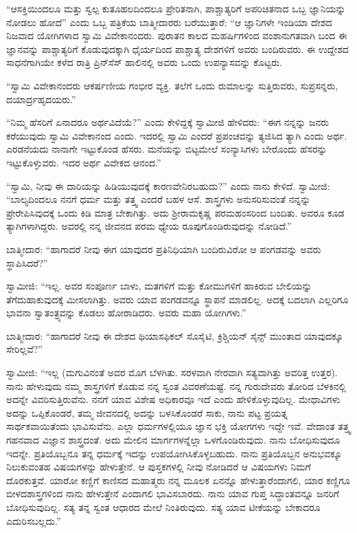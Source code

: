  “ಆಸಕ್ತಿಯಿಂದಲೂ ಮತ್ತು ಸ್ವಲ್ಪ ಕುತೂಹಲದಿಂದಲೂ ಪ್ರೇರಿತನಾಗಿ, ಪಾಶ್ಚಾತ್ಯರಿಗೆ ಅಪರಿಚಿತನಾದ ಒಬ್ಬ ಜ್ಞಾನಿಯನ್ನು ನೋಡಲು ಹೋದೆ” ಎಂದು ಒಬ್ಬ ಪತ್ರಿಕೆಯ ಬಾತ್ಮೀದಾರರು ಬರೆಯುತ್ತಾರೆ: “ಆ ಜ್ಞಾನಿಗಳೇ ಇಂಡಿಯಾ ದೇಶದ ನಿಜವಾದ ಯೋಗಿಗಳಾದ ಸ್ವಾಮಿ ವಿವೇಕಾನಂದರು. ಪುರಾತನ ಕಾಲದ ಮಹರ್ಷಿಗಳಿಂದ ವಂಶಾನುಗತವಾಗಿ ಬಂದ ಈ ಜ್ಞಾನವನ್ನು ಪಾಶ್ಚಾತ್ಯರಿಗೆ ಕೊಡುವುದಕ್ಕಾಗಿ ಧೈರ್ಯದಿಂದ ಪಾಶ್ಚಾತ್ಯ ದೇಶಗಳಿಗೆ ಅವರು ಬಂದಿರುವರು. ಈ ಉದ್ದೇಶದ ಸಾಧನೆಗಾಗಿಯೇ ಕಳೆದ ರಾತ್ರಿ ಪ್ರಿನ್‍ಸೆಸ್ ಹಾಲಿನಲ್ಲಿ ಅವರು ಒಂದು ಉಪನ್ಯಾಸವನ್ನು ಕೊಟ್ಟರು. 

 “ಸ್ವಾಮಿ ವಿವೇಕಾನಂದರು ಆಕರ್ಷಣೀಯ ಗಂಭೀರ ವ್ಯಕ್ತಿ. ತಲೆಗೆ ಒಂದು ರುಮಾಲನ್ನು ಸುತ್ತಿರುವರು, ಸುಪ್ರಸನ್ನರು, ದಯಾರ್ದ್ರಹೃದಯರು.” 

 “ನಿಮ್ಮ ಹೆಸರಿಗೆ ಏನಾದರೂ ಅರ್ಥವಿದೆಯೆ?” ಎಂದು ಕೇಳಿದ್ದಕ್ಕೆ ಸ್ವಾಮೀಜಿ ಹೇಳಿದರು: “ಈಗ ನನ್ನನ್ನು ಜನರು ಕರೆಯುವುದು ಸ್ವಾಮಿ ವಿವೇಕಾನಂದ ಎಂದು. ಇದರಲ್ಲಿ ಸ್ವಾಮಿ ಎಂದರೆ ಪ್ರಪಂಚವನ್ನು ತ್ಯಜಿಸಿದ ತ್ಯಾಗಿ ಎಂದು ಅರ್ಥ. ಎರಡನೆಯದು ನಾನಾಗೇ ಇಟ್ಟುಕೊಂಡ ಹೆಸರು. ಮನೆಯನ್ನು ಬಿಟ್ಟಮೇಲೆ ಸಂನ್ಯಾಸಿಗಳು ಬೇರೊಂದು ಹೆಸರನ್ನು ಇಟ್ಟುಕೊಳ್ಳುವರು. ಇದರ ಅರ್ಥ ವಿವೇಕದ ಆನಂದ.” 

 “ಸ್ವಾಮಿ, ನೀವು ಈ ದಾರಿಯನ್ನು ಹಿಡಿಯುವುದಕ್ಕೆ ಕಾರಣವೇನಿರಬಹುದು?” ಎಂದು ನಾನು ಕೇಳಿದೆ. ಸ್ವಾಮೀಜಿ: “ಬಾಲ್ಯದಿಂದಲೂ ನನಗೆ ಧರ್ಮ ಮತ್ತು ತತ್ತ್ವ ಎಂದರೆ ಬಹಳ ಆಸೆ. ಶಾಸ್ತ್ರಗಳು ಅನುಸರಿಸುವಂತೆ ನನ್ನನ್ನು ಪ್ರೇರೇಪಿಸಿವುದಕ್ಕೆ ಒಂದು ಕಿಡಿ ಮಾತ್ರ ಬೇಕಾಗಿತ್ತು. ಅದು ಶ‍್ರೀರಾಮಕೃಷ್ಣ ಪರಮಹಂಸರಿಂದ ಬಂದಿತು. ಅವರೂ ಕೂಡ ತ್ಯಾಗಿಗಳಾಗಿದ್ದರು. ಅವರಲ್ಲಿ ನನ್ನ ಜೀವನದ ಪರಮ ಧ್ಯೇಯ ರೂಪುಗೊಂಡಿರುವುದನ್ನು ನೋಡಿದೆ.” 

\vskip 3pt

 ಬಾತ್ಮೀದಾರ: “ಹಾಗಾದರೆ ನೀವು ಈಗ ಯಾವುದರ ಪ್ರತಿನಿಧಿಯಾಗಿ ಬಂದಿರುವಿರೋ ಆ ಪಂಗಡವನ್ನು ಅವರು ಸ್ಥಾಪಿಸಿದರೆ?” 

\vskip 3pt

 ಸ್ವಾಮೀಜಿ: “ಇಲ್ಲ. ಅವರ ಸಂಪೂರ್ಣ ಬಾಳು, ಮತಗಳಿಗೆ ಮತ್ತು ಕೋಮುಗಳಿಗೆ ಹಾಕಿರುವ ಬೇಲಿಯನ್ನು ತೆಗೆದುಹಾಕುವುದಕ್ಕೆ ಮೀಸಲಾಗಿತ್ತು. ಅವರು ಯಾವ ಪಂಗಡವನ್ನೂ ಸ್ಥಾಪನೆ ಮಾಡಲಿಲ್ಲ. ಅದಕ್ಕೆ ಬದಲಾಗಿ ಎಲ್ಲರಿಗೂ ಭಾವನಾ ಸ್ವಾತಂತ್ರ್ಯವನ್ನು ಕೊಡಲು ಹೋರಾಡಿದರು. ಅವರು ಮಹಾ ಯೋಗಿಗಳು.” 

\vskip 3pt

 ಬಾತ್ಮೀದಾರ: “ಹಾಗಾದರೆ ನೀವು ಈ ದೇಶದ ಥಿಯಾಸಫಿಕಲ್ ಸೊಸೈಟಿ, ಕ್ರಿಶ್ಚಿಯನ್ ಸೈನ್ಸ್ ಮುಂತಾದ ಯಾವುದಕ್ಕೂ ಸೇರಿಲ್ಲವೆ?” 

 ಸ್ವಾಮೀಜಿ: “ಇಲ್ಲ (ಮಗುವಿನಂತೆ ಅವರ ಮೊಗ ಬೆಳಗಿತು. ಸರಳವಾಗಿ ನೇರವಾಗಿ ಸತ್ಯವಾಗಿತ್ತು ಅವರಿತ್ತ ಉತ್ತರ). ನಾನು ಹೇಳುವುದು ನಮ್ಮ ಶಾಸ್ತ್ರಗಳಿಗೆ ಕೊಡುವ ನನ್ನ ಸ್ವಂತ ವಿವರಣೆಯಷ್ಟೆ. ನನ್ನ ಗುರುದೇವರು ತೋರಿದ ಬೆಳಕಿನಲ್ಲಿ ಅದನ್ನೇ ವಿವರಿಸುತ್ತಿರುವೆನು. ನನಗೆ ಯಾವ ವಿಶೇಷ ಅಧಿಕಾರವೂ ಇದೆ ಎಂದು ಹೇಳಿಕೊಳ್ಳುವುದಿಲ್ಲ. ಮೇಧಾವಿಗಳು ಅದನ್ನು ಒಪ್ಪಿಕೊಂಡರೆ, ತಮ್ಮ ಜೀವನದಲ್ಲಿ ಅದನ್ನು ಬಳಸಿಕೊಂಡರೆ ಸಾಕು, ನಾನು ಪಟ್ಟ ಪ್ರಯತ್ನ ಸಾರ್ಥಕವಾಯಿತೆಂದು ಭಾವಿಸುವೆನು. ಎಲ್ಲಾ ಧರ್ಮಗಳಲ್ಲಿಯೂ ಜ್ಞಾನ ಭಕ್ತಿ ಯೋಗಗಳು ಇದ್ದೇ ಇವೆ. ವೇದಾಂತ ತತ್ತ್ವ ಗಹನವಾದ ವಿಜ್ಞಾನ ಶಾಸ್ತ್ರದಂತೆ. ಅದು ಮೇಲಿನ ಮಾರ್ಗಗಳನ್ನೆಲ್ಲಾ ಒಳಗೊಂಡಿರುವುದು. ನಾನು ಬೋಧಿಸುವುದೂ ಇದನ್ನೇ. ಪ್ರತಿಯೊಬ್ಬನೂ ತನ್ನ ಧರ್ಮಕ್ಕೆ ಇದನ್ನು ಉಪಯೋಗಿಸಿಕೊಳ್ಳಬಹುದು. ನಾನು ಪ್ರತಿಯೊಬ್ಬನ ಅನುಭವಕ್ಕೂ ನಿಲುಕುವಂತಹ ವಿಷಯಗಳನ್ನು ಹೇಳುತ್ತೇನೆ. ಆ ಪುಸ್ತಕಗಳಲ್ಲಿ ನೀವು ನೋಡಿದರೆ ಆ ವಿಷಯಗಳು ನಿಮಗೆ ದೊರಕುತ್ತವೆ. ಯಾರೋ ಕಣ್ಣಿಗೆ ಕಾಣಿಸದ ಮಹಾತ್ಮರು ನನ್ನ ಮೂಲಕ ಏನನ್ನೊ ಹೇಳುತ್ತಾರೆಂದಾಗಲಿ, ಯಾರ ಕಣ್ಣಿಗೂ ಬೀಳದ\break ಶಾಸ್ತ್ರಗಳಿಂದ ನಾನು ಹೇಳುತ್ತೇನೆ ಎಂದಾಗಲಿ ಭಾವಿಸಬಾರದು. ನಾನು ಯಾವ ಗುಪ್ತ ಸಿದ್ಧಾಂತವನ್ನೂ ಜನರಿಗೆ ಬೋಧಿಸುವುದಿಲ್ಲ. ಸತ್ಯ ತನ್ನ ಸ್ವಂತ ಆಧಾರದ ಮೇಲೆ ನಿಂತಿರುವುದು. ಸತ್ಯ ಯಾವ ಟೀಕೆಯನ್ನು ಬೇಕಾದರೂ ಎದುರಿಸಬಲ್ಲದು.” 

